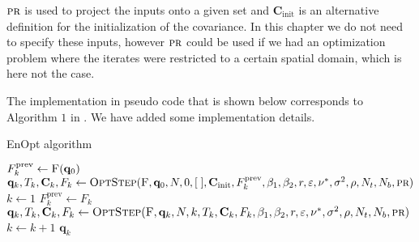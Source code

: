 $\textproc{pr}$ is used to project the inputs onto a given set and $\mathbf{C}_\mathrm{init}$ is an alternative definition for the initialization of the covariance. In this chapter we do not need to specify these inputs, however $\textproc{pr}$ could be used if we had an optimization problem where the iterates were restricted to a certain spatial domain, which is here not the case.

The implementation in pseudo code that is shown below corresponds to Algorithm $1$ in \cite{Keil2022-dj}. We have added some implementation details.

\begin{algorithm}[H]%
\caption{\label{EnOptAlg}EnOpt algorithm}
\begin{algorithmic}[1]
\State \label{EnOptAlgFOMCall}$F^\mathrm{prev}_{k}\gets \Call{F}{\mathbf{q}_0}$
\State\label{EnOptAlgOptStepCall1} $\mathbf{q}_k,T_k,\mathbf{C}_k,F_k\gets\Call{OptStep}{\textproc{F},\mathbf{q}_0,N,0,[\;],\mathbf{C}_\mathrm{init},F^\mathrm{prev}_{k},\beta_1,\beta_2,r,\varepsilon,\nu^*,\sigma^2,\rho, N_t, N_b, \textproc{pr}}$
\State $k\gets 1$
\label{EnOptAlgBeginWhile}
\State $F^\mathrm{prev}_k\gets F_k$
\State\label{EnOptAlgOptStepCall2} $\mathbf{q}_{k},T_{k},\mathbf{C}_k,F_{k}\gets\Call{OptStep}{\textproc{F},\mathbf{q}_k,N,k,T_k,\mathbf{C}_k,F_k,\beta_1,\beta_2,r,\varepsilon,\nu^*,\sigma^2,\rho, N_t, N_b,\textproc{pr}}$
\State $k\gets k+1$
\EndWhile\label{EnOptAlgEndWhile}
\State \Return $\mathbf{q}_k$
\EndFunction
\end{algorithmic}
\end{algorithm}

